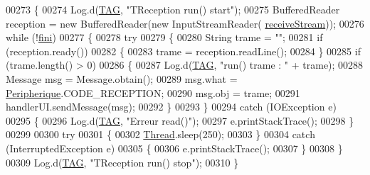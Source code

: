 \begin{DoxyCode}
00273         \{
00274             Log.d(\hyperlink{classcom_1_1lasalle_1_1io__trucks_1_1_peripherique_a9ad17604c5e0a0ca93908a76af9db6cc}{TAG}, \textcolor{stringliteral}{"TReception run() start"});
00275             BufferedReader reception = \textcolor{keyword}{new} BufferedReader(\textcolor{keyword}{new} InputStreamReader(
      \hyperlink{classcom_1_1lasalle_1_1io__trucks_1_1_peripherique_aa9909de8df9a7873f63d9e2a3e08772d}{receiveStream}));
00276             \textcolor{keywordflow}{while} (!\hyperlink{classcom_1_1lasalle_1_1io__trucks_1_1_peripherique_1_1_t_reception_af9ba647e407a9a150e1c37972233dbf9}{fini})
00277             \{
00278                 \textcolor{keywordflow}{try}
00279                 \{
00280                     String trame = \textcolor{stringliteral}{""};
00281                     \textcolor{keywordflow}{if} (reception.ready())
00282                     \{
00283                         trame = reception.readLine();
00284                     \}
00285                     \textcolor{keywordflow}{if} (trame.length() > 0)
00286                     \{
00287                         Log.d(\hyperlink{classcom_1_1lasalle_1_1io__trucks_1_1_peripherique_a9ad17604c5e0a0ca93908a76af9db6cc}{TAG}, \textcolor{stringliteral}{"run() trame : "} + trame);
00288                         Message msg = Message.obtain();
00289                         msg.what = \hyperlink{classcom_1_1lasalle_1_1io__trucks_1_1_peripherique_a89c00428bc04098ada95e4c5d4b4a168}{Peripherique}.CODE\_RECEPTION;
00290                         msg.obj = trame;
00291                         handlerUI.sendMessage(msg);
00292                     \}
00293                 \}
00294                 \textcolor{keywordflow}{catch} (IOException e)
00295                 \{
00296                     Log.d(\hyperlink{classcom_1_1lasalle_1_1io__trucks_1_1_peripherique_a9ad17604c5e0a0ca93908a76af9db6cc}{TAG}, \textcolor{stringliteral}{"Erreur read()"});
00297                     e.printStackTrace();
00298                 \}
00299 
00300                 \textcolor{keywordflow}{try}
00301                 \{
00302                     \hyperlink{class_thread}{Thread}.sleep(250);
00303                 \}
00304                 \textcolor{keywordflow}{catch} (InterruptedException e)
00305                 \{
00306                     e.printStackTrace();
00307                 \}
00308             \}
00309             Log.d(\hyperlink{classcom_1_1lasalle_1_1io__trucks_1_1_peripherique_a9ad17604c5e0a0ca93908a76af9db6cc}{TAG}, \textcolor{stringliteral}{"TReception run() stop"});
00310         \}
\end{DoxyCode}



